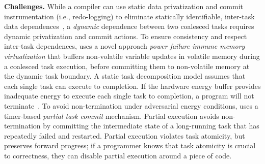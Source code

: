 \textbf{Challenges.} While a compiler can use static data privatization and commit instrumentation
(i.e., redo-logging) to eliminate statically identifiable, inter-task data
dependences~\citep{alpaca}, a \emph{dynamic} dependence between two coalesced
tasks requires dynamic privatization and commit actions. 
%
To ensure consistency and respect inter-task dependences, \sys uses a novel
approach \emph{power failure immune memory virtualization} that buffers non-volatile variable
updates in volatile memory during a coalesced task execution, before committing
them to non-volatile memory at the dynamic task boundary.
%
A static task decomposition model assumes that each
single task can execute to completion. If the hardware energy buffer provides
inadequate energy to execute each single task to completion, a program will not
terminate~\cite{cleancut_2018}. To avoid non-termination under adversarial
energy conditions, \sys uses a timer-based {\em partial task commit} mechanism.
Partial execution avoids non-termination by committing the intermediate state of a long-running
task that has repeatedly failed and restarted. Partial execution violates
task atomicity, but preserves forward progress; if a programmer knows that
task atomicity is crucial to correctness, they can disable partial execution around a piece of code.
%
